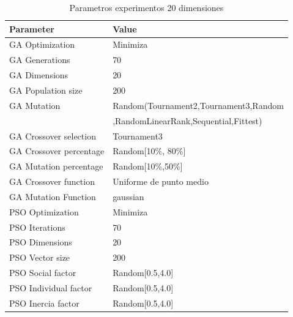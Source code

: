 \documentclass[runningheads]{llncs}
\begin{document}
          \begin{table}[htp]
            \caption{Parametros experimentos 20 dimensiones}
            \label{table:ga-pso-parameters-20}
            \centering
            \begin{tabular}{|l|l|}
            \hline
            Parameter & Value \\
            \hline
            \hline
            GA Optimization & Minimiza \\
            \hline
            GA Generations & 70 \\
            \hline
            GA Dimensions & 20 \\
            \hline
            GA Population size & 200 \\
            \hline
            GA Mutation & Random(Tournament2,Tournament3,Random \\
            &  ,RandomLinearRank,Sequential,Fittest)\\
            \hline
            GA Crossover selection & Tournament3 \\
            \hline
            GA Crossover percentage & Random[10\%, 80\%] \\
            \hline
            GA Mutation percentage & Random[10\%,50\%] \\
            \hline
            GA Crossover function & Uniforme de punto medio \\
            \hline
            GA Mutation Function & gaussian \\
            \hline
            PSO Optimization & Minimiza \\
            \hline
            PSO Iterations & 70 \\
            \hline
            PSO Dimensions & 20 \\
            \hline
            PSO Vector size & 200 \\
            \hline
            PSO Social factor & Random[0.5,4.0] \\
            \hline
            PSO Individual factor & Random[0.5,4.0] \\
            \hline
            PSO Inercia factor & Random[0.5,4.0] \\
            \hline
            \end{tabular}
            \end{table}
          
      
\end{document}
